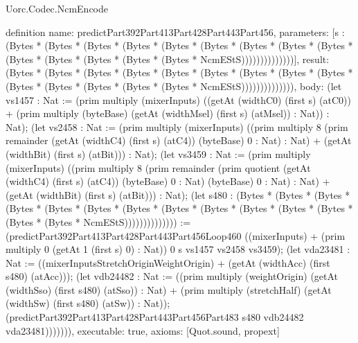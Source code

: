 \begin{lexlean}{Uorc.Codec.NcmEncode}
\begin{semanticmodule}
definition{
  name: predictPart392Part413Part428Part443Part456,
  parameters: [s : (Bytes * (Bytes * (Bytes * (Bytes * (Bytes * (Bytes * (Bytes * (Bytes * (Bytes * (Bytes * (Bytes * (Bytes * (Bytes * (Bytes * NcmEStS))))))))))))))],
  result: (Bytes * (Bytes * (Bytes * (Bytes * (Bytes * (Bytes * (Bytes * (Bytes * (Bytes * (Bytes * (Bytes * (Bytes * (Bytes * (Bytes * NcmEStS)))))))))))))),
  body: (let vs1457 : Nat := (prim multiply (mixerInputs) ((getAt (widthC0) (first s) (atC0)) + (prim multiply (byteBase) (getAt (widthMsel) (first s) (atMsel)) : Nat)) : Nat); (let vs2458 : Nat := (prim multiply (mixerInputs) ((prim multiply 8 (prim remainder (getAt (widthC4) (first s) (atC4)) (byteBase) 0 : Nat) : Nat) + (getAt (widthBit) (first s) (atBit))) : Nat); (let vs3459 : Nat := (prim multiply (mixerInputs) ((prim multiply 8 (prim remainder (prim quotient (getAt (widthC4) (first s) (atC4)) (byteBase) 0 : Nat) (byteBase) 0 : Nat) : Nat) + (getAt (widthBit) (first s) (atBit))) : Nat); (let s480 : (Bytes * (Bytes * (Bytes * (Bytes * (Bytes * (Bytes * (Bytes * (Bytes * (Bytes * (Bytes * (Bytes * (Bytes * (Bytes * (Bytes * NcmEStS)))))))))))))) := (predictPart392Part413Part428Part443Part456Loop460 ((mixerInputs) + (prim multiply 0 (getAt 1 (first s) 0) : Nat)) 0 s vs1457 vs2458 vs3459); (let vda23481 : Nat := ((mixerInputsStretchOriginWeightOrigin) + (getAt (widthAcc) (first s480) (atAcc))); (let vdb24482 : Nat := ((prim multiply (weightOrigin) (getAt (widthSso) (first s480) (atSso)) : Nat) + (prim multiply (stretchHalf) (getAt (widthSw) (first s480) (atSw)) : Nat)); (predictPart392Part413Part428Part443Part456Part483 s480 vdb24482 vda23481))))))),
  executable: true,
  axioms: [Quot.sound, propext]
}


\end{semanticmodule}
\end{lexlean}
